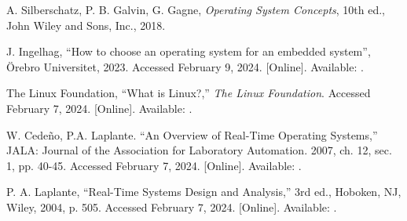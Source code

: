 \begin{thebibliography}{99}

        A. Silberschatz, P. B. Galvin, G. Gagne,
        \textit{Operating System Concepts}, 10th ed.,
        John Wiley and Sons, Inc., 2018.

        J. Ingelhag,
        ``How to choose an operating system for an embedded system'',
        \"Orebro Universitet, 2023.
        Accessed February 9, 2024.
        [Online].
        Available: .

        The Linux Foundation,
        ``What is Linux?,''
        \textit{The Linux Foundation}.
        Accessed February 7, 2024.
        [Online].
        Available: .

        W. Cede\~no, P.A. Laplante.
        ``An Overview of Real-Time Operating Systems,''
        JALA: Journal of the Association for Laboratory Automation. 2007, ch. 12, sec. 1, pp. 40-45.
        Accessed February 7, 2024.
        [Online].
        Available: .

        P. A. Laplante,
        ``Real-Time Systems Design and Analysis,'' 3rd ed.,
        Hoboken, NJ, Wiley, 2004, p. 505.
        Accessed February 7, 2024.
        [Online].
        Available: .

\end{thebibliography}
